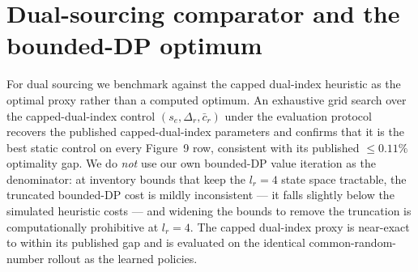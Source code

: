 \documentclass[11pt]{article}
\begin{document}
\section{Dual-sourcing comparator and the bounded-DP optimum}
\label{app:ds-validation}

For dual sourcing we benchmark against the capped dual-index heuristic as the optimal proxy rather
than a computed optimum. An exhaustive grid search over the capped-dual-index control
$(s_e,\Delta_r,\bar c_r)$ under the evaluation protocol recovers the published capped-dual-index
parameters and confirms that it is the best static control on every Figure~9 row, consistent with
its published $\le0.11\%$ optimality gap. We do \emph{not} use our own bounded-DP value iteration as
the denominator: at inventory bounds that keep the $l_r=4$ state space tractable, the truncated
bounded-DP cost is mildly inconsistent --- it falls slightly below the simulated heuristic costs ---
and widening the bounds to remove the truncation is computationally prohibitive at $l_r=4$. The
capped dual-index proxy is near-exact to within its published gap and is evaluated on the identical
common-random-number rollout as the learned policies.
\end{document}
